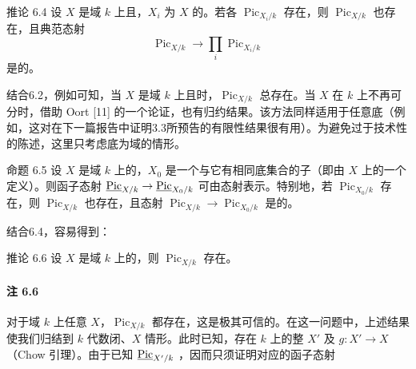 \begin{statement}{推论 6.4}
设 $X$ 是域 $k$ 上且，$X_i$ 为 $X$ 的。若各 $\operatorname{Pic}_{X_i/k}$ 存在，则 $\operatorname{Pic}_{X/k}$ 也存在，且典范态射
\[\operatorname{Pic}_{X/k}\longrightarrow\prod_i\operatorname{Pic}_{X_i/k}\]
是的。
\end{statement}
结合6.2，例如可知，当 $X$ 是域 $k$ 上且时，$\operatorname{Pic}_{X/k}$ 总存在。当 $X$ 在 $k$ 上不再可分时，借助 Oort [11] 的一个论证，也有归约结果。该方法同样适用于任意底（例如，这对在下一篇报告中证明3.3所预告的有限性结果很有用）。为避免过于技术性的陈述，这里只考虑底为域的情形。

\begin{statement}{命题 6.5}
设 $X$ 是域 $k$ 上的，$X_0$ 是一个与它有相同底集合的子（即由 $X$ 上的一个定义）。则函子态射 $\underline{\operatorname{Pic}}_{X/k}\to\underline{\operatorname{Pic}}_{X_0/k}$ 可由态射表示。特别地，若 $\operatorname{Pic}_{X_0/k}$ 存在，则 $\operatorname{Pic}_{X/k}$ 也存在，且态射 $\operatorname{Pic}_{X/k}\to\operatorname{Pic}_{X_0/k}$ 是的。
\end{statement}
结合6.4，容易得到：
\begin{statement}{推论 6.6}
设 $X$ 是域 $k$ 上的，则 $\operatorname{Pic}_{X/k}$ 存在。
\end{statement}

\paragraph{注 6.6}
对于域 $k$ 上任意 $X$，$\operatorname{Pic}_{X/k}$ 都存在，这是极其可信的。在这一问题中，上述结果使我们归结到 $k$ 代数闭、$X$ 情形。此时已知，存在 $k$ 上的整 $X'$ 及 $g:X'\to X$（Chow 引理）。由于已知 $\underline{\operatorname{Pic}}_{X'/k}$ ，因而只须证明对应的函子态射

